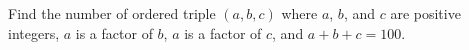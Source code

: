 Find the number of ordered triple $(a,b,c)$ where $a$, $b$, and $c$ are positive integers, $a$ is a factor of $b$, $a$ is a factor of $c$, and $a+b+c=100$.